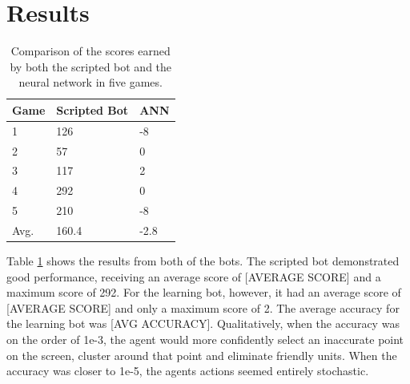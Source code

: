\documentclass{amsart}
\theoremstyle{definition}
\begin{document}
\section{Results}


\begin{table}[]
\caption{Comparison of the scores earned by both the scripted bot and the neural network in five games.}
\label{tab:scores}
\begin{tabular}{|l|l|l|}
\hline
Game & Scripted Bot & ANN  \\ \hline
1    & 126          & -8   \\ \hline
2    & 57           & 0    \\ \hline
3    & 117          & 2    \\ \hline
4    & 292          & 0    \\ \hline
5    & 210          & -8   \\ \hline
Avg. & 160.4        & -2.8 \\ \hline
\end{tabular}
\end{table}


Table \ref{tab:scores} shows the results from both of the bots.
The scripted bot demonstrated good performance, receiving an average score of [AVERAGE SCORE] and a maximum score of 292.
For the learning bot, however, it had an average score of [AVERAGE SCORE] and only a maximum score of 2.
The average accuracy for the learning bot was [AVG ACCURACY].
Qualitatively, when the accuracy was on the order of 1e-3, the agent would more confidently select an inaccurate point on the screen, cluster around that point and eliminate friendly units.
When the accuracy was closer to 1e-5, the agents actions seemed entirely stochastic.








\end{document}

